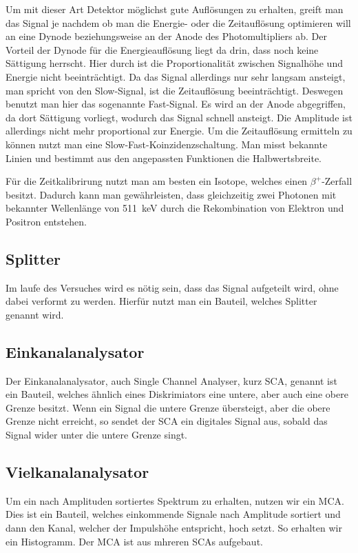 \documentclass[11pt, ngerman, fleqn, DIV=15, headinclude, BCOR=2cm]{scrreprt}
\begin{document}
Um mit dieser Art Detektor möglichst gute Auflösungen zu erhalten, greift man
das Signal je nachdem ob man die Energie- oder die Zeitauflösung optimieren will
an eine Dynode beziehungsweise an der Anode des Photomultipliers ab.
Der Vorteil der Dynode für die Energieauflösung liegt da drin, dass noch keine
Sättigung herrscht. Hier durch ist die Proportionalität zwischen Signalhöhe und
Energie nicht beeinträchtigt. Da das Signal allerdings nur sehr langsam
ansteigt, man spricht von den Slow-Signal, ist die Zeitauflösung beeinträchtigt.
Deswegen benutzt man hier das sogenannte Fast-Signal. Es wird an der Anode
abgegriffen, da dort Sättigung vorliegt, wodurch das Signal schnell ansteigt.
Die Amplitude ist allerdings nicht mehr proportional zur Energie.
Um die Zeitauflösung ermitteln zu können nutzt man eine
Slow-Fast-Koinzidenzschaltung. Man misst bekannte Linien und bestimmt aus den
angepassten Funktionen die Halbwertsbreite.

Für die Zeitkalibrirung nutzt man
am besten ein Isotope, welches einen $\beta^+$-Zerfall besitzt. Dadurch kann
man gewährleisten, dass gleichzeitig zwei Photonen mit bekannter Wellenlänge
von \SI{511}{\kilo\electronvolt} durch die Rekombination von Elektron und
Positron entstehen.

\subsection{Splitter}
Im laufe des Versuches wird es nötig sein, dass das Signal aufgeteilt wird,
ohne dabei verformt zu werden. Hierfür nutzt man ein Bauteil, welches Splitter
genannt wird. 

\subsection{Einkanalanalysator}
Der Einkanalanalysator, auch Single Channel Analyser, kurz SCA, genannt ist ein
Bauteil, welches ähnlich eines Diskrimiators eine untere, aber auch eine obere
Grenze besitzt. Wenn ein Signal die untere Grenze übersteigt, aber die obere
Grenze nicht erreicht, so sendet der SCA ein digitales Signal aus, sobald das
Signal wider unter die untere Grenze singt.

\subsection{Vielkanalanalysator}
Um ein nach Amplituden sortiertes Spektrum zu erhalten, nutzen wir ein MCA.
Dies ist ein Bauteil, welches einkommende Signale nach Amplitude sortiert und
dann den Kanal, welcher der Impulshöhe entspricht, hoch setzt. So erhalten wir ein
Histogramm. Der MCA ist aus mhreren SCAs aufgebaut.
\end{document}
